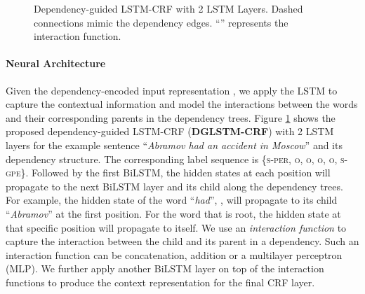 \documentclass[11pt,a4paper]{article}
\begin{document}
\begin{figure}[t!]
{ 
	}
\caption{Dependency-guided LSTM-CRF with 2 LSTM Layers. Dashed connections mimic the dependency edges. ``'' represents the interaction function.}
\label{fig:model2layer}
\end{figure}




\paragraph{Neural Architecture}
Given the dependency-encoded input representation , we apply the LSTM to capture the contextual information and model the interactions between the words and their corresponding parents in the dependency trees. 
Figure \ref{fig:model2layer} shows the proposed dependency-guided LSTM-CRF (\textbf{DGLSTM-CRF}) with 2 LSTM layers for the example sentence ``\textit{Abramov had an accident in Moscow}'' and its dependency structure. 
The corresponding label sequence is \{\textsc{s-per}, \textsc{o}, \textsc{o}, \textsc{o}, \textsc{o}, \textsc{s-gpe}\}. 
Followed by the first BiLSTM, the hidden states at each position will propagate to the next BiLSTM layer and its child along the dependency trees. 
For example, the hidden state of the word ``\textit{had}'', , will propagate to its child ``\textit{Abramov}'' at the first position. 
For the word that is root, the hidden state at that specific position will propagate to itself. 
We use an \textit{interaction function}  to capture the interaction between the child and its parent in a dependency. 
Such an interaction function can be concatenation, addition or a  multilayer perceptron (MLP). 
We further apply another BiLSTM layer on top of the interaction functions to produce the context representation for the final CRF layer. 
\end{document}
